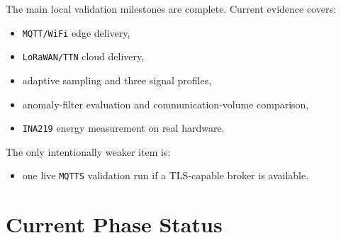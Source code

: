 \documentclass[12pt,a4paper]{article}
\begin{document}
The main local validation milestones are complete. Current evidence covers:

\begin{itemize}
    \item \texttt{MQTT/WiFi} edge delivery,
    \item \texttt{LoRaWAN/TTN} cloud delivery,
    \item adaptive sampling and three signal profiles,
    \item anomaly-filter evaluation and communication-volume comparison,
    \item \texttt{INA219} energy measurement on real hardware.
\end{itemize}

The only intentionally weaker item is:

\begin{itemize}
    \item one live \texttt{MQTTS} validation run if a TLS-capable broker is available.
\end{itemize}

\section{Current Phase Status}
\end{document}
